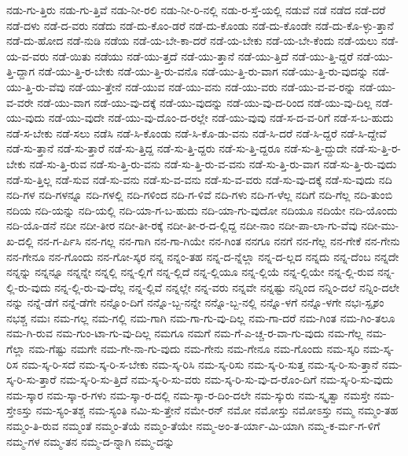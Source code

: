 {ನಡು-ಗು-ತ್ತಿರು
ನಡು-ಗು-ತ್ತಿವೆ
ನಡು-ನೀ-ರಲಿ
ನಡು-ನೀ-ರಿ-ನಲ್ಲಿ
ನಡು-ರ-ಸ್ತೆ-ಯಲ್ಲಿ
ನಡುವೆ
ನಡೆ
ನಡೆದ
ನಡೆ-ದರೆ
ನಡೆ-ದಳು
ನಡೆ-ದ-ವರು
ನಡೆದು
ನಡೆ-ದು-ಕೊಂ-ಡರೆ
ನಡೆ-ದು-ಕೊಂಡು
ನಡೆ-ದು-ಕೊಂಡೇ
ನಡೆ-ದು-ಕೊ-ಳ್ಳು-ತ್ತಾನೆ
ನಡೆ-ದು-ಹೋದ
ನಡೆ-ನುಡಿ
ನಡೆಯ
ನಡೆ-ಯ-ಬೇ-ಕಾ-ದರೆ
ನಡೆ-ಯ-ಬೇಕು
ನಡೆ-ಯ-ಬೇ-ಕೆಂದು
ನಡೆ-ಯಲು
ನಡೆ-ಯ-ವ-ವರು
ನಡೆ-ಯಿತು
ನಡೆಯು
ನಡೆ-ಯು-ತ್ತದೆ
ನಡೆ-ಯು-ತ್ತಾನೆ
ನಡೆ-ಯು-ತ್ತಿದೆ
ನಡೆ-ಯು-ತ್ತಿ-ದ್ದರೆ
ನಡೆ-ಯು-ತ್ತಿ-ದ್ದಾಗ
ನಡೆ-ಯು-ತ್ತಿ-ರ-ಬೇಕು
ನಡೆ-ಯು-ತ್ತಿ-ರು-ವನೊ
ನಡೆ-ಯು-ತ್ತಿ-ರು-ವಾಗ
ನಡೆ-ಯು-ತ್ತಿ-ರು-ವುದನ್ನು
ನಡೆ-ಯು-ತ್ತಿ-ರು-ವೆವು
ನಡೆ-ಯು-ತ್ತೇನೆ
ನಡೆ-ಯುವ
ನಡೆ-ಯು-ವನು
ನಡೆ-ಯು-ವರು
ನಡೆ-ಯು-ವ-ವ-ರನ್ನು
ನಡೆ-ಯು-ವ-ವರೇ
ನಡೆ-ಯು-ವಾಗ
ನಡೆ-ಯು-ವು-ದಕ್ಕೆ
ನಡೆ-ಯು-ವುದನ್ನು
ನಡೆ-ಯು-ವು-ದ-ರಿಂದ
ನಡೆ-ಯು-ವು-ದಿಲ್ಲ
ನಡೆ-ಯು-ವುದು
ನಡೆ-ಯು-ವುದೇ
ನಡೆ-ಯು-ವು-ದೊಂ-ದ-ರಲ್ಲೇ
ನಡೆ-ಯು-ವುವು
ನಡೆ-ಸ-ದ-ವ-ರಿಗೆ
ನಡೆ-ಸ-ಬ-ಹುದು
ನಡೆ-ಸ-ಬೇಕು
ನಡೆ-ಸಲು
ನಡೆಸಿ
ನಡೆ-ಸಿ-ಕೊಂಡು
ನಡೆ-ಸಿ-ಕೊ-ಡು-ವನು
ನಡೆ-ಸಿ-ದರೆ
ನಡೆ-ಸಿ-ದ್ದರೆ
ನಡೆ-ಸಿ-ದ್ದೇವೆ
ನಡೆ-ಸು-ತ್ತಾನೆ
ನಡೆ-ಸು-ತ್ತಾರೆ
ನಡೆ-ಸು-ತ್ತಿದ್ದ
ನಡೆ-ಸು-ತ್ತಿ-ದ್ದರು
ನಡೆ-ಸು-ತ್ತಿ-ದ್ದರೂ
ನಡೆ-ಸು-ತ್ತಿ-ದ್ದುದೇ
ನಡೆ-ಸು-ತ್ತಿ-ರ-ಬೇಕು
ನಡೆ-ಸು-ತ್ತಿ-ರುವ
ನಡೆ-ಸು-ತ್ತಿ-ರು-ವನು
ನಡೆ-ಸು-ತ್ತಿ-ರು-ವ-ವನು
ನಡೆ-ಸು-ತ್ತಿ-ರು-ವಾಗ
ನಡೆ-ಸು-ತ್ತಿ-ರು-ವುದು
ನಡೆ-ಸು-ತ್ತಿಲ್ಲ
ನಡೆ-ಸುವ
ನಡೆ-ಸು-ವನು
ನಡೆ-ಸು-ವ-ವನು
ನಡೆ-ಸು-ವ-ವರು
ನಡೆ-ಸು-ವು-ದಕ್ಕೆ
ನಡೆ-ಸು-ವುದು
ನದಿ
ನದಿ-ಗಳ
ನದಿ-ಗಳನ್ನೂ
ನದಿ-ಗಳಲ್ಲಿ
ನದಿ-ಗಳಿಂದ
ನದಿ-ಗ-ಳಿವೆ
ನದಿ-ಗಳು
ನದಿ-ಗ-ಳೆಲ್ಲ
ನದಿಗೆ
ನದಿ-ಗೆಲ್ಲ
ನದಿ-ತುಂಬಿ
ನದಿಯ
ನದಿ-ಯನ್ನು
ನದಿ-ಯಲ್ಲಿ
ನದಿ-ಯಾ-ಗ-ಬ-ಹುದು
ನದಿ-ಯಾ-ಗು-ವುದೋ
ನದಿಯೂ
ನದಿಯೇ
ನದಿ-ಯೊಂದು
ನದಿ-ಯೊ-ಡನೆ
ನದೀ
ನದೀ-ತೀರ
ನದೀ-ತೀ-ರಕ್ಕೆ
ನದೀ-ತೀ-ರ-ದ-ಲ್ಲಿದ್ದ
ನದೀ-ನಾಂ
ನದೀ-ಪಾ-ಲಾ-ಗು-ವೆವು
ನದೀ-ಮು-ಖ-ದಲ್ಲಿ
ನನ-ಗ-ರ್ಪಿಸಿ
ನನ-ಗಲ್ಲ
ನನ-ಗಾಗಿ
ನನ-ಗಾ-ಗಿಯೇ
ನನ-ಗಿಂತ
ನನಗೂ
ನನಗೆ
ನನ-ಗೆಲ್ಲ
ನನ-ಗೇಕೆ
ನನ-ಗೇನು
ನನ-ಗೇನೂ
ನನ-ಗೊಂದು
ನನ-ಗೋ-ಸ್ಕರ
ನನ್ನ
ನನ್ನಂ-ತಹ
ನನ್ನ-ದ-ನ್ನೆಲ್ಲಾ
ನನ್ನ-ದ-ಲ್ಲದ
ನನ್ನದು
ನನ್ನ-ದೆಂಬ
ನನ್ನದೇ
ನನ್ನನ್ನು
ನನ್ನನ್ನೂ
ನನ್ನನ್ನೇ
ನನ್ನಲ್ಲಿ
ನನ್ನ-ಲ್ಲಿಗೆ
ನನ್ನ-ಲ್ಲಿದೆ
ನನ್ನ-ಲ್ಲಿಯೂ
ನನ್ನ-ಲ್ಲಿಯೆ
ನನ್ನ-ಲ್ಲಿಯೇ
ನನ್ನ-ಲ್ಲಿ-ರುವ
ನನ್ನ-ಲ್ಲಿ-ರು-ವುದು
ನನ್ನ-ಲ್ಲಿ-ರು-ವು-ದೆಲ್ಲ
ನನ್ನ-ಲ್ಲಿವೆ
ನನ್ನಲ್ಲೇ
ನನ್ನ-ವರು
ನನ್ನವೇ
ನನ್ನಷ್ಟು
ನನ್ನಿಂದ
ನನ್ನಿಂ-ದಲೆ
ನನ್ನಿಂ-ದಲೇ
ನನ್ನು
ನನ್ನೆ-ಡೆಗೆ
ನನ್ನೆ-ಡೆಗೇ
ನನ್ನೊಂ-ದಿಗೆ
ನನ್ನೊ-ಬ್ಬ-ನನ್ನೇ
ನನ್ನೊ-ಬ್ಬ-ನಲ್ಲಿ
ನನ್ನೊ-ಳಗೆ
ನನ್ನೊ-ಳಗೇ
ನಭಃ-ಸ್ಪೃಶಂ
ನಭಶ್ಚ
ನಮಃ
ನಮ-ಗಲ್ಲ
ನಮ-ಗಲ್ಲಿ
ನಮ-ಗಾಗಿ
ನಮ-ಗಾ-ಗು-ವು-ದಿಲ್ಲ
ನಮ-ಗಾ-ದರೆ
ನಮ-ಗಿಂತ
ನಮ-ಗಿಂ-ತಲೂ
ನಮ-ಗಿ-ರುವ
ನಮ-ಗುಂ-ಟಾ-ಗು-ವು-ದಿಲ್ಲ
ನಮಗೂ
ನಮಗೆ
ನಮ-ಗೆ-ಎ-ಚ್ಚ-ರ-ವಾ-ಗು-ವುದು
ನಮ-ಗೆಲ್ಲ
ನಮ-ಗೆಲ್ಲಾ
ನಮ-ಗೆಷ್ಟು
ನಮಗೇ
ನಮ-ಗೇ-ನಾ-ಗು-ವುದು
ನಮ-ಗೇನು
ನಮ-ಗೇನೂ
ನಮ-ಗೊಂದು
ನಮ-ಸ್ಕರಿ
ನಮ-ಸ್ಕ-ರಿಸ
ನಮ-ಸ್ಕ-ರಿ-ಸದೆ
ನಮ-ಸ್ಕ-ರಿ-ಸ-ಬೇಕು
ನಮ-ಸ್ಕ-ರಿಸಿ
ನಮ-ಸ್ಕ-ರಿಸು
ನಮ-ಸ್ಕ-ರಿ-ಸುತ್ತ
ನಮ-ಸ್ಕ-ರಿ-ಸು-ತ್ತಾನೆ
ನಮ-ಸ್ಕ-ರಿ-ಸು-ತ್ತಾರೆ
ನಮ-ಸ್ಕ-ರಿ-ಸು-ತ್ತಿದೆ
ನಮ-ಸ್ಕ-ರಿ-ಸು-ವರು
ನಮ-ಸ್ಕ-ರಿ-ಸು-ವು-ದ-ರೊಂ-ದಿಗೆ
ನಮ-ಸ್ಕ-ರಿ-ಸು-ವುದು
ನಮ-ಸ್ಕಾರ
ನಮ-ಸ್ಕಾ-ರ-ಗಳು
ನಮ-ಸ್ಕಾ-ರ-ದಲ್ಲಿ
ನಮ-ಸ್ಕಾ-ರ-ದಿಂ-ದಲೇ
ನಮ-ಸ್ಕುರು
ನಮ-ಸ್ಕೃತ್ವಾ
ನಮಸ್ತೇ
ನಮ-ಸ್ತೇಽಸ್ತು
ನಮ-ಸ್ಯಂ-ತಶ್ಚ
ನಮ-ಸ್ಯಂತಿ
ನಮಿ-ಸು-ತ್ತೇನೆ
ನಮೇ-ರನ್
ನಮೋ
ನಮೋಸ್ತು
ನಮೋಽಸ್ತು
ನಮ್ಮ
ನಮ್ಮಂ-ತಹ
ನಮ್ಮಂ-ತಿ-ರುವ
ನಮ್ಮಂತೆ
ನಮ್ಮಂ-ತೆಯೆ
ನಮ್ಮಂ-ತೆಯೇ
ನಮ್ಮ-ಅಂ-ತ-ರ್ಯಾ-ಮಿ-ಯಾಗಿ
ನಮ್ಮ-ಕ-ರ್ಮ-ಗ-ಳಿಗೆ
ನಮ್ಮ-ಗಳ
ನಮ್ಮ-ತನ
ನಮ್ಮ-ದ-ನ್ನಾಗಿ
ನಮ್ಮ-ದನ್ನು
}
